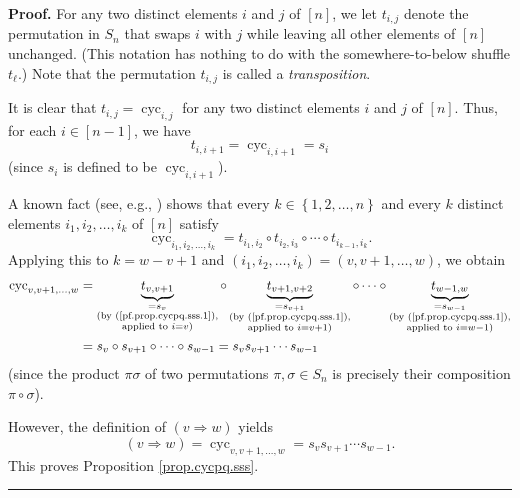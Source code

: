 \documentclass[numbers=enddot,12pt,final,onecolumn,notitlepage]{scrartcl}%
\theoremstyle{definition}
\newenvironment{verlong}{}{}
\newenvironment{proof}[1][Proof]{\noindent\textbf{#1.} }{\ \rule{0.5em}{0.5em}}
\begin{document}
\begin{verlong}
\begin{proof}
For any two distinct elements $i$ and $j$ of $\left[  n\right]  $, we let
$t_{i,j}$ denote the permutation in $S_{n}$ that swaps $i$ with $j$ while
leaving all other elements of $\left[  n\right]  $ unchanged. (This notation
has nothing to do with the somewhere-to-below shuffle $t_{\ell}$.) Note that
the permutation $t_{i,j}$ is called a \emph{transposition}.

It is clear that $t_{i,j}=\operatorname*{cyc}\nolimits_{i,j}$ for any two
distinct elements $i$ and $j$ of $\left[  n\right]  $. Thus, for each
$i\in\left[  n-1\right]  $, we have%
\begin{equation}
t_{i,i+1}=\operatorname*{cyc}\nolimits_{i,i+1}=s_{i}
\label{pf.prop.cycpq.sss.1}%
\end{equation}
(since $s_{i}$ is defined to be $\operatorname*{cyc}\nolimits_{i,i+1}$).

A known fact (see, e.g., \cite[Exercise 5.16]{detnotes}) shows that every
$k\in\left\{  1,2,\ldots,n\right\}  $ and every $k$ distinct elements
$i_{1},i_{2},\ldots,i_{k}$ of $\left[  n\right]  $ satisfy%
\[
\operatorname*{cyc}\nolimits_{i_{1},i_{2},\ldots,i_{k}}=t_{i_{1},i_{2}}\circ
t_{i_{2},i_{3}}\circ\cdots\circ t_{i_{k-1},i_{k}}.
\]
Applying this to $k=w-v+1$ and $\left(  i_{1},i_{2},\ldots,i_{k}\right)
=\left(  v,v+1,\ldots,w\right)  $, we obtain%
\begin{align*}
\operatorname*{cyc}\nolimits_{v,v+1,\ldots,w}  &  =\underbrace{t_{v,v+1}%
}_{\substack{=s_{v}\\\text{(by (\ref{pf.prop.cycpq.sss.1}),}\\\text{applied to
}i=v\text{)}}}\circ\underbrace{t_{v+1,v+2}}_{\substack{=s_{v+1}\\\text{(by
(\ref{pf.prop.cycpq.sss.1}),}\\\text{applied to }i=v+1\text{)}}}\circ
\cdots\circ\underbrace{t_{w-1,w}}_{\substack{=s_{w-1}\\\text{(by
(\ref{pf.prop.cycpq.sss.1}),}\\\text{applied to }i=w-1\text{)}}}\\
&  =s_{v}\circ s_{v+1}\circ\cdots\circ s_{w-1}=s_{v}s_{v+1}\cdots s_{w-1}%
\end{align*}
(since the product $\pi\sigma$ of two permutations $\pi,\sigma\in S_{n}$ is
precisely their composition $\pi\circ\sigma$).

However, the definition of $\left(  v\Longrightarrow w\right)  $ yields%
\[
\left(  v\Longrightarrow w\right)  =\operatorname*{cyc}\nolimits_{v,v+1,\ldots
,w}=s_{v}s_{v+1}\cdots s_{w-1}.
\]
This proves Proposition \ref{prop.cycpq.sss}.
\end{proof}
\end{verlong}
\end{document}
